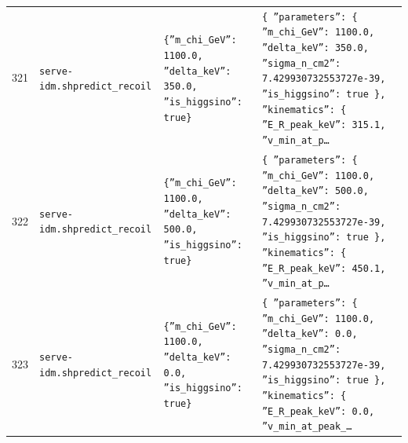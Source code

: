 \documentclass[11pt,a4paper]{article}
\begin{document}
\begin{longtable}{@{}p{}p{}p{}p{}@{}}
321 & \texttt{serve-idm.sh}\newline\texttt{predict\_\allowbreak{}recoil} & \texttt{\{''m\_\allowbreak{}chi\_\allowbreak{}GeV'':\allowbreak{} 1100.0,\allowbreak{} ''delta\_\allowbreak{}keV'':\allowbreak{} 350.0,\allowbreak{} ''is\_\allowbreak{}higgsino'':\allowbreak{} true\}\allowbreak{}} & \texttt{\{   ''parameters'':\allowbreak{} \{     ''m\_\allowbreak{}chi\_\allowbreak{}GeV'':\allowbreak{} 1100.0,\allowbreak{}     ''delta\_\allowbreak{}keV'':\allowbreak{} 350.0,\allowbreak{}     ''sigma\_\allowbreak{}n\_\allowbreak{}cm2'':\allowbreak{} 7.429930732553727e-39,\allowbreak{}     ''is\_\allowbreak{}higgsino'':\allowbreak{} true   \}\allowbreak{},\allowbreak{}   ''kinematics'':\allowbreak{} \{     ''E\_\allowbreak{}R\_\allowbreak{}peak\_\allowbreak{}keV'':\allowbreak{} 315.1,\allowbreak{}     ''v\_\allowbreak{}min\_\allowbreak{}at\_\allowbreak{}p\ldots{}\allowbreak{}} \\
322 & \texttt{serve-idm.sh}\newline\texttt{predict\_\allowbreak{}recoil} & \texttt{\{''m\_\allowbreak{}chi\_\allowbreak{}GeV'':\allowbreak{} 1100.0,\allowbreak{} ''delta\_\allowbreak{}keV'':\allowbreak{} 500.0,\allowbreak{} ''is\_\allowbreak{}higgsino'':\allowbreak{} true\}\allowbreak{}} & \texttt{\{   ''parameters'':\allowbreak{} \{     ''m\_\allowbreak{}chi\_\allowbreak{}GeV'':\allowbreak{} 1100.0,\allowbreak{}     ''delta\_\allowbreak{}keV'':\allowbreak{} 500.0,\allowbreak{}     ''sigma\_\allowbreak{}n\_\allowbreak{}cm2'':\allowbreak{} 7.429930732553727e-39,\allowbreak{}     ''is\_\allowbreak{}higgsino'':\allowbreak{} true   \}\allowbreak{},\allowbreak{}   ''kinematics'':\allowbreak{} \{     ''E\_\allowbreak{}R\_\allowbreak{}peak\_\allowbreak{}keV'':\allowbreak{} 450.1,\allowbreak{}     ''v\_\allowbreak{}min\_\allowbreak{}at\_\allowbreak{}p\ldots{}\allowbreak{}} \\
323 & \texttt{serve-idm.sh}\newline\texttt{predict\_\allowbreak{}recoil} & \texttt{\{''m\_\allowbreak{}chi\_\allowbreak{}GeV'':\allowbreak{} 1100.0,\allowbreak{} ''delta\_\allowbreak{}keV'':\allowbreak{} 0.0,\allowbreak{} ''is\_\allowbreak{}higgsino'':\allowbreak{} true\}\allowbreak{}} & \texttt{\{   ''parameters'':\allowbreak{} \{     ''m\_\allowbreak{}chi\_\allowbreak{}GeV'':\allowbreak{} 1100.0,\allowbreak{}     ''delta\_\allowbreak{}keV'':\allowbreak{} 0.0,\allowbreak{}     ''sigma\_\allowbreak{}n\_\allowbreak{}cm2'':\allowbreak{} 7.429930732553727e-39,\allowbreak{}     ''is\_\allowbreak{}higgsino'':\allowbreak{} true   \}\allowbreak{},\allowbreak{}   ''kinematics'':\allowbreak{} \{     ''E\_\allowbreak{}R\_\allowbreak{}peak\_\allowbreak{}keV'':\allowbreak{} 0.0,\allowbreak{}     ''v\_\allowbreak{}min\_\allowbreak{}at\_\allowbreak{}peak\_\allowbreak{}\ldots{}\allowbreak{}} \\

\end{longtable}
\end{document}

